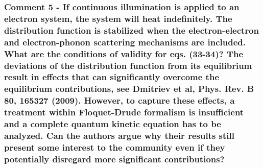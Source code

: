 \documentclass{article}
\begin{document}
\subsubsection*{Comment 5 -
\color{RoyalBlue} If continuous illumination is applied to an electron system, the system will heat indefinitely. The distribution function is stabilized when the electron-electron and electron-phonon scattering mechanisms are included. What are the conditions of validity for eqs. (33-34)? The deviations of the distribution function from its equilibrium result in effects that can significantly overcome the equilibrium contributions, see Dmitriev et al, Phys. Rev. B 80, 165327 (2009). However, to capture these effects, a treatment within Floquet-Drude formalism is insufficient and a complete quantum kinetic equation has to be analyzed. Can the authors argue why their results still present some interest to the community even if they potentially disregard more significant contributions?
}
\end{document}
